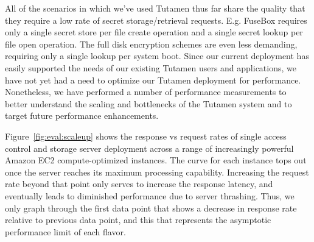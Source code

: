 All of the scenarios in which we've used Tutamen thus far share the
quality that they require a low rate of secret storage/retrieval
requests. E.g. FuseBox requires only a single secret store per file
create operation and a single secret lookup per file open
operation. The full disk encryption schemes are even less demanding,
requiring only a single lookup per system boot. Since our current
deployment has easily supported the needs of our existing Tutamen
users and applications, we have not yet had a need to optimize our
Tutamen deployment for performance. Nonetheless, we have performed a
number of performance measurements to better understand the scaling
and bottlenecks of the Tutamen system and to target future performance
enhancements.

Figure~\ref{fig:eval:scaleup} shows the response vs request rates of
single access control and storage server deployment across a range of
increasingly powerful Amazon EC2 compute-optimized instances. The
curve for each instance tops out once the server reaches its maximum
processing capability. Increasing the request rate beyond that point
only serves to increase the response latency, and eventually leads to
diminished performance due to server thrashing. Thus, we only graph
through the first data point that shows a decrease in response rate
relative to previous data point, and this that represents the
asymptotic performance limit of each flavor.

